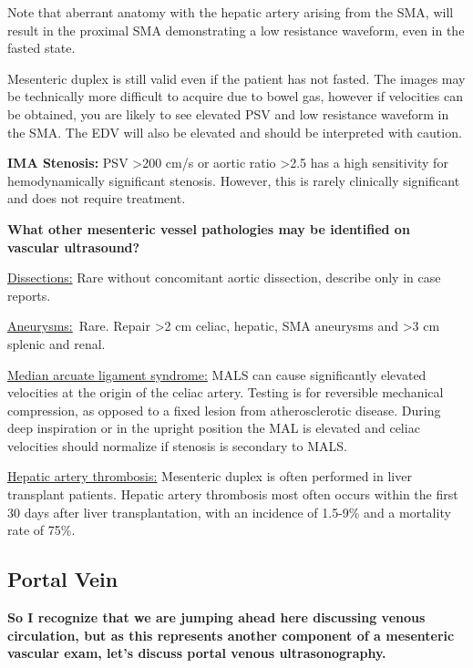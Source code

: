 \documentclass[
]{book}
\begin{document}
Note that aberrant anatomy with the hepatic artery arising from the SMA,
will result in the proximal SMA demonstrating a low resistance waveform,
even in the fasted state.\citep{pellerito2019}

Mesenteric duplex is still valid even if the patient has not fasted. The
images may be technically more difficult to acquire due to bowel gas,
however if velocities can be obtained, you are likely to see elevated
PSV and low resistance waveform in the SMA. The EDV will also be
elevated and should be interpreted with caution.

\textbf{IMA Stenosis:} PSV \textgreater200 cm/s or aortic ratio \textgreater2.5 has a high
sensitivity for hemodynamically significant stenosis. However, this is
rarely clinically significant and does not require treatment.

\textbf{What other mesenteric vessel pathologies may be identified on vascular
ultrasound?}

\uline{Dissections:} Rare without concomitant aortic dissection,
describe only in case reports.\citep{gouëffic2002, oglesby2006}

\uline{Aneurysms:}~Rare. Repair \textgreater2 cm celiac, hepatic, SMA
aneurysms and \textgreater3 cm splenic and renal.

\uline{Median arcuate ligament syndrome:} MALS can cause
significantly elevated velocities at the origin of the celiac artery.
Testing is for reversible mechanical compression, as opposed to a fixed
lesion from atherosclerotic disease. During deep inspiration or in the
upright position the MAL is elevated and celiac velocities should
normalize if stenosis is secondary to MALS.\citep{tembey2015}

\uline{Hepatic artery thrombosis:} Mesenteric duplex is often
performed in liver transplant patients. Hepatic artery thrombosis most
often occurs within the first 30 days after liver transplantation, with
an incidence of 1.5-9\% and a mortality rate of 75\%.\citep{garcía-criado2009, sanyal2012}

\hypertarget{portal-vein}{%
\subsection{Portal Vein}\label{portal-vein}}

\textbf{So I recognize that we are jumping ahead here discussing venous
circulation, but as this represents another component of a mesenteric
vascular exam, let's discuss portal venous ultrasonography.}
\end{document}
